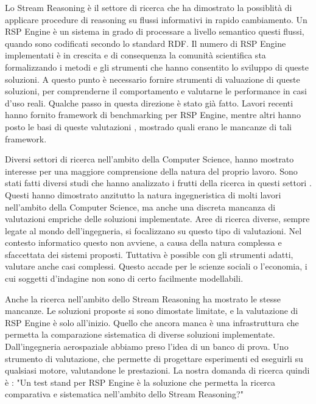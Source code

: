 Lo Stream Reasoning \`e  il settore di ricerca che ha dimostrato la possiblit\`a di applicare procedure di reasoning su flussi informativi in rapido cambiamento. Un RSP Engine \`e  un sistema in grado di processare a livello semantico questi flussi, quando sono codificati secondo lo standard RDF. Il numero di RSP Engine implementati \`e  in crescita e di consequenza la comunit\`a scientifica sta formalizzando i metodi e gli strumenti che hanno consentito lo sviluppo di queste soluzioni. A questo punto \`e  necessario fornire strumenti di valuazione di queste soluzioni, per comprenderne il comportamento e valutarne le performance in casi d'uso reali. 
Qualche passo in questa direzione \`e  stato gi\`a fatto. Lavori recenti \cite{Zhang2012, LePhuoc2012c, DBLP:conf/semweb/DellAglioCBCV13} hanno fornito framework di benchmarking per RSP Engine, mentre altri hanno posto le basi di queste valutazioni \cite{DBLP:conf/esws/ScharrenbachUMVB13}, mostrado quali erano le mancanze di tali framework.

Diversi settori di ricerca nell'ambito della Computer Science, hanno mostrato interesse per una maggiore comprensione della natura del proprio lavoro. Sono stati fatti diversi studi che hanno analizzato i frutti della ricerca in questi settori \cite{Tichy:1995:EEC:209090.209093, Wainer:2009:EEC:1518331.1518552}. Questi hanno dimostrato anzitutto la natura ingegneristica di molti lavori nell'ambito della Computer Science, ma anche una discreta mancanza di valutazioni empriche delle soluzioni implementate. Aree di ricerca diverse, sempre legate al mondo dell'ingegneria, si focalizzano su questo tipo di valutazioni. Nel contesto informatico questo non avviene, a causa della natura complessa e sfaccettata dei sistemi proposti. Tuttativa \`e  possible con gli strumenti adatti, valutare anche casi complessi. Questo accade per le scienze sociali o l'economia, i cui soggetti d'indagine non sono di certo facilmente modellabili.

Anche la ricerca nell'ambito dello Stream Reasoning ha mostrato le stesse mancanze. Le soluzioni proposte si sono dimostate limitate, e la valutazione di RSP Engine \`e  solo all'inizio. Quello che ancora manca \`e  una infrastruttura che permetta la comparazione sistematica di diverse soluzioni implementate. Dall'ingegneria aerospaziale abbiamo preso l'idea di un banco di prova. Uno strumento di valutazione, che permette di progettare esperimenti ed eseguirli su qualsiasi motore, valutandone le prestazioni. %
La nostra domanda di ricerca quindi \`e : "Un test stand per RSP Engine \`e  la soluzione che permetta la ricerca comparativa e sistematica nell'ambito dello Stream Reasoning?"

